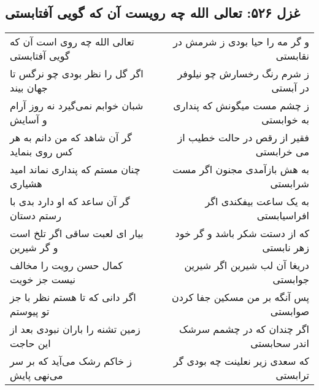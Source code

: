 \begin{center}
\section*{غزل ۵۲۶: تعالی الله چه رویست آن که گویی آفتابستی}
\label{sec:526}
\begin{longtable}{l p{0.5cm} r}
تعالی الله چه روی است آن که گویی آفتابستی
&&
و گر مه را حیا بودی ز شرمش در نقابستی
\\
اگر گل را نظر بودی چو نرگس تا جهان بیند
&&
ز شرم رنگ رخسارش چو نیلوفر در آبستی
\\
شبان خوابم نمی‌گیرد نه روز آرام و آسایش
&&
ز چشم مست میگونش که پنداری به خوابستی
\\
گر آن شاهد که من دانم به هر کس روی بنماید
&&
فقیر از رقص در حالت خطیب از می خرابستی
\\
چنان مستم که پنداری نماند امید هشیاری
&&
به هش بازآمدی مجنون اگر مست شرابستی
\\
گر آن ساعد که او دارد بدی با رستم دستان
&&
به یک ساعت بیفکندی اگر افراسیابستی
\\
بیار ای لعبت ساقی اگر تلخ است و گر شیرین
&&
که از دستت شکر باشد و گر خود زهر نابستی
\\
کمال حسن رویت را مخالف نیست جز خویت
&&
دریغا آن لب شیرین اگر شیرین جوابستی
\\
اگر دانی که تا هستم نظر با جز تو پیوستم
&&
پس آنگه بر من مسکین جفا کردن صوابستی
\\
زمین تشنه را باران نبودی بعد از این حاجت
&&
اگر چندان که در چشمم سرشک اندر سحابستی
\\
ز خاکم رشک می‌آید که بر سر می‌نهی پایش
&&
که سعدی زیر نعلینت چه بودی گر ترابستی
\\
\end{longtable}
\end{center}
